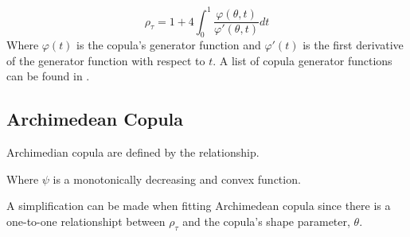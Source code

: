 \begin{equation}
\rho_\tau = 1 + 4 \int_0^1 \frac{\varphi(\theta,t)}{\varphi'(\theta, t)}dt
\label{eq:tauar}
\end{equation}
Where $\varphi(t)$ is the copula's generator function and $\varphi'(t)$ is the first derivative of the generator function with respect to $t$. A list of copula generator functions can be found in \cite{Nelsen2006}. 

\subsection*{Archimedean Copula}

Archimedian copula are defined by the relationship.

Where $\psi$ is a monotonically decreasing and convex function.

A simplification can be made when fitting Archimedean copula since there is a one-to-one relationshipt between $\rho_\tau$ and the copula's shape parameter, $\theta$.
